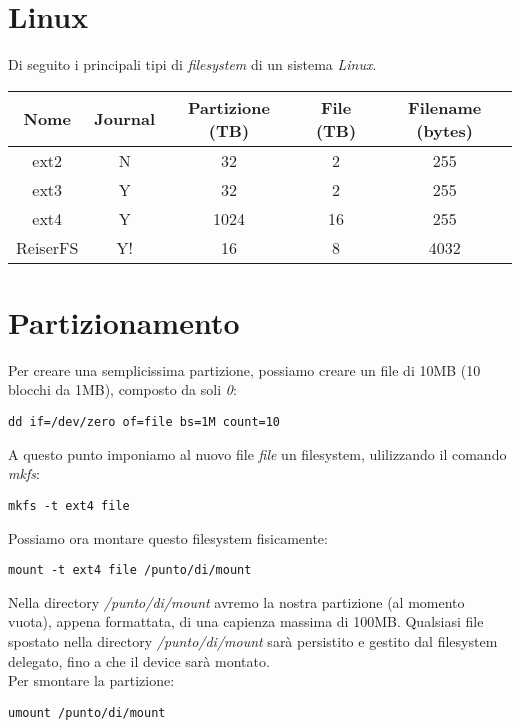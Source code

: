 \section{Linux}
Di seguito i principali tipi di \textit{filesystem} di un sistema \textit{Linux}.
\begin{center}
    \begin{tabular}{|c|c|c|c|c|}
        \hline
        \textbf{Nome} & \textbf{Journal} & \textbf{Partizione (TB)} & \textbf{File (TB)} & \textbf{Filename (bytes)} \\ \hline
        ext2        & N     & 32    & 2     & 255   \\ \hline
        ext3        & Y     & 32    & 2     & 255   \\ \hline
        ext4        & Y     & 1024  & 16    & 255   \\ \hline
        ReiserFS    & Y!    & 16    & 8     & 4032  \\ \hline
    \end{tabular}
\end{center}

\section{Partizionamento}
Per creare una semplicissima partizione, possiamo creare un file di 10MB (10 blocchi da 1MB), composto da soli \textit{0}:
\begin{lstlisting}
dd if=/dev/zero of=file bs=1M count=10
\end{lstlisting}
A questo punto imponiamo al nuovo file \textit{file} un filesystem, ulilizzando il comando \textit{mkfs}:
\begin{lstlisting}
mkfs -t ext4 file
\end{lstlisting}
Possiamo ora montare questo filesystem fisicamente:
\begin{lstlisting}
mount -t ext4 file /punto/di/mount
\end{lstlisting}
Nella directory \textit{/punto/di/mount} avremo la nostra partizione (al momento vuota), appena formattata, di una capienza massima di 100MB.
Qualsiasi file spostato nella directory \textit{/punto/di/mount} sarà persistito e gestito dal filesystem delegato, fino a che il device sarà montato. \\
Per smontare la partizione:
\begin{lstlisting}
umount /punto/di/mount
\end{lstlisting}